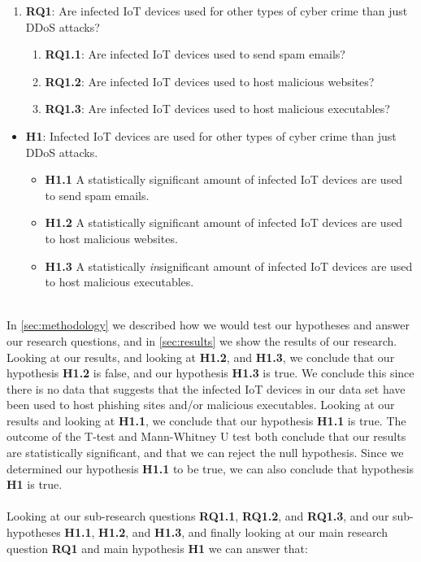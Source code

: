 \documentclass[a4paper,10pt]{article}
\begin{document}
\begin{enumerate}
 \item[] \textbf{RQ1}: Are infected IoT devices used for other types of cyber crime than just DDoS attacks? 
 \begin{enumerate}
  \item[] \textbf{RQ1.1}: Are infected IoT devices used to send spam emails? 
  \item[] \textbf{RQ1.2}: Are infected IoT devices used to host malicious websites? 
  \item[] \textbf{RQ1.3}: Are infected IoT devices used to host malicious executables? 
 \end{enumerate}
\end{enumerate}
\begin{itemize}
  \item[] \textbf{H1}: Infected IoT devices are used for other types of cyber crime than just DDoS attacks.
  \begin{itemize}
    \item[] \textbf{H1.1} A statistically significant amount of infected IoT devices are used to send spam emails.
    \item[] \textbf{H1.2} A statistically significant amount of infected IoT devices are used to host malicious websites.
    \item[] \textbf{H1.3} A statistically \textit{in}significant amount of infected IoT devices are used to host malicious 
    executables.
  \end{itemize}
\end{itemize}
~\\
In \autoref{sec:methodology} we described how we would test our hypotheses and answer our research questions, and
in \autoref{sec:results} we show the results of our research. Looking at our results, and  looking at \textbf{H1.2}, and 
\textbf{H1.3}, we conclude that our hypothesis \textbf{H1.2} is false, and our hypothesis \textbf{H1.3} is true. We conclude 
this since there is no data that suggests that the infected IoT devices in our data set have been used to host phishing sites 
and/or malicious executables. Looking at our results and looking at \textbf{H1.1}, we conclude that our hypothesis 
\textbf{H1.1} is true. The outcome of the T-test and Mann-Whitney U test both conclude that our results are statistically
significant, and that we can reject the null hypothesis. Since we determined our hypothesis \textbf{H1.1} to be true, we
can also conclude that hypothesis \textbf{H1} is true.
\\\\
Looking at our sub-research questions \textbf{RQ1.1}, \textbf{RQ1.2}, and \textbf{RQ1.3}, and our sub-hypotheses
\textbf{H1.1}, \textbf{H1.2}, and \textbf{H1.3}, and finally looking at our main research question \textbf{RQ1} and main
hypothesis \textbf{H1} we can answer that:
\end{document}
